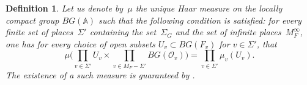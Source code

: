 \documentclass[a4paper,english,12pt]{amsart}
\newcommand{\GG}{ G}
\newcommand{\Ov}{\mathcal O _v}
\newcommand{\vMF}{v\in M_F}
\newcommand{\AAA}{\mathbb A}
\DeclareMathOperator{\Gal}{Gal}
\DeclareMathOperator{\Id}{Id}
\DeclareMathOperator{\Frob}{Frob}
\DeclareMathOperator{\un}{un}
\newtheorem{mydef}[equation]{Definition}
\numberwithin{equation}{subsection}
\begin{document}
\begin{mydef}
Let us denote by~$\mu$ the unique Haar measure on the locally compact group $BG(\AAA)$ such that the following condition is satisfied: for every finite set of places~$\Sigma'$ containing the set~$\Sigma_G$ and the set of infinite places~$M_F^\infty$, one has for every choice of open subsets  $U_v\subset BG(F_v)$ for $v\in \Sigma'$, that $$\mu\bigg(\prod_{v\in \Sigma '}U_v\times\prod_{v\in M_F-\Sigma'}B\GG(\Ov)\bigg)=\prod_{v\in\Sigma'}\mu_v(U_v).$$ The existence of a such measure is guaranteed by \cite[Proposition 5.5]{Ramakrishnan}. %
\end{mydef}
\end{document}
